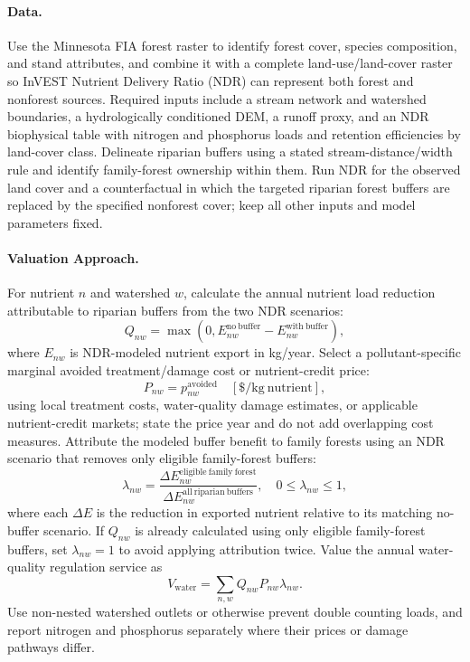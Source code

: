 \documentclass[11pt]{article}
\begin{document}
\paragraph{Data.}
Use the Minnesota FIA forest raster to identify forest cover, species composition, and stand attributes, and combine it with a complete land-use/land-cover raster so InVEST Nutrient Delivery Ratio (NDR) can represent both forest and nonforest sources. Required inputs include a stream network and watershed boundaries, a hydrologically conditioned DEM, a runoff proxy, and an NDR biophysical table with nitrogen and phosphorus loads and retention efficiencies by land-cover class. Delineate riparian buffers using a stated stream-distance/width rule and identify family-forest ownership within them. Run NDR for the observed land cover and a counterfactual in which the targeted riparian forest buffers are replaced by the specified nonforest cover; keep all other inputs and model parameters fixed.

\paragraph{Valuation Approach.}
For nutrient $n$ and watershed $w$, calculate the annual nutrient load reduction attributable to riparian buffers from the two NDR scenarios:
\[
Q_{nw}=\max\left(0,E_{nw}^{\mathrm{no\ buffer}}-E_{nw}^{\mathrm{with\ buffer}}\right),
\]
where $E_{nw}$ is NDR-modeled nutrient export in kg/year. Select a pollutant-specific marginal avoided treatment/damage cost or nutrient-credit price:
\[
P_{nw}=p_{nw}^{\mathrm{avoided}}\quad [\$/\mathrm{kg\ nutrient}],
\]
using local treatment costs, water-quality damage estimates, or applicable nutrient-credit markets; state the price year and do not add overlapping cost measures. Attribute the modeled buffer benefit to family forests using an NDR scenario that removes only eligible family-forest buffers:
\[
\lambda_{nw}=
\frac{\Delta E_{nw}^{\mathrm{eligible\ family\ forest}}}
{\Delta E_{nw}^{\mathrm{all\ riparian\ buffers}}},
\quad
0\leq\lambda_{nw}\leq1,
\]
where each $\Delta E$ is the reduction in exported nutrient relative to its matching no-buffer scenario. If $Q_{nw}$ is already calculated using only eligible family-forest buffers, set $\lambda_{nw}=1$ to avoid applying attribution twice. Value the annual water-quality regulation service as
\[
V_{\mathrm{water}}=\sum_{n,w}Q_{nw}P_{nw}\lambda_{nw}.
\]
Use non-nested watershed outlets or otherwise prevent double counting loads, and report nitrogen and phosphorus separately where their prices or damage pathways differ.
\end{document}
